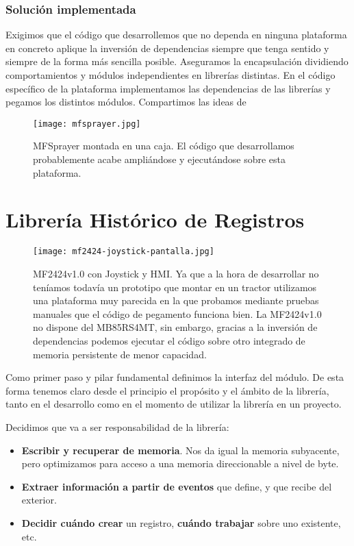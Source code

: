 \subsubsection{Solución implementada}

Exigimos que el código que desarrollemos que no dependa en ninguna
plataforma en concreto aplique la inversión de dependencias siempre
que tenga sentido y siempre de la forma más sencilla posible. Aseguramos la
encapsulación dividiendo comportamientos y módulos independientes
en librerías distintas. En el código específico de la plataforma
implementamos las dependencias de las librerías y pegamos los distintos
módulos. Compartimos las ideas de \cite[Modularity: Glue Layers]{ArtOfUnixProgramming}

\begin{figure}[!h]
    \centering
    \texttt{[image: mfsprayer.jpg]}
    \caption{MFSprayer montada en una caja. El código que desarrollamos
    probablemente acabe ampliándose y ejecutándose sobre esta plataforma.}
\end{figure}

\section{Librería Histórico de Registros}

\begin{figure}[h]
    \centering
    \texttt{[image: mf2424-joystick-pantalla.jpg]}
    \caption{MF2424v1.0 con Joystick y HMI. Ya que a la hora de desarrollar
    no teníamos todavía un prototipo que montar en un tractor utilizamos
    una plataforma muy parecida en la que probamos mediante pruebas manuales
    que el código de pegamento funciona bien. La MF2424v1.0 no dispone del
    MB85RS4MT, sin embargo, gracias a la inversión de dependencias podemos
    ejecutar el código sobre otro integrado de memoria persistente de menor
    capacidad.}
\end{figure}

Como primer paso y pilar fundamental definimos la interfaz del
módulo. De esta forma tenemos claro desde el principio el propósito
y el ámbito de la librería, tanto en el desarrollo como en el momento
de utilizar la librería en un proyecto.

Decidimos que va a ser responsabilidad de la librería:
\begin{itemize}[noitemsep,nolistsep]
    \item \textbf{Escribir y recuperar de memoria}. Nos da igual
          la memoria subyacente, pero optimizamos para acceso a una
          memoria direccionable a nivel de byte.
    \item \textbf{Extraer información a partir de eventos} que define, y que
          recibe del exterior.
    \item \textbf{Decidir cuándo crear} un registro, \textbf{cuándo trabajar} sobre
          uno existente, etc.
\end{itemize}

